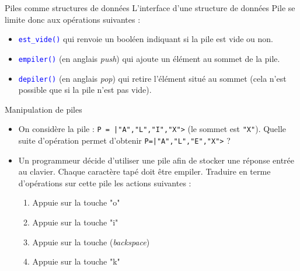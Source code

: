 \documentclass[10pt]{beamer}
\begin{document}
\begin{frame}{\Ctitle}{\stitle}
	\begin{alertblock}{Piles comme structures de données}
		L'interface d'une structure de données Pile se limite donc aux opérations suivantes :
		\begin{itemize}
			\item<2-> \textcolor{blue}{\tt est\_vide()} qui renvoie un booléen indiquant si la pile est vide ou non.
			\item<3-> \textcolor{blue}{\tt empiler()} (en anglais \textit{push}) qui ajoute un élément au sommet de la pile.
			\item<4-> \textcolor{blue}{\tt depiler()} (en anglais \textit{pop}) qui retire l'élément situé au sommet (cela n'est possible que si la pile n'est pas vide).
		\end{itemize}
	\end{alertblock}
\end{frame}

\begin{frame}{\Ctitle}{\stitle}
	\begin{exampleblock}{Manipulation de piles}
		\begin{itemize}
			\item<2-> On considère la pile : {\tt P = |"A","L","I","X">} (le sommet est {\tt "X"}). Quelle suite d'opération permet d'obtenir {\tt P=|"A","L","E","X">} ?
			\item<3-> Un programmeur décide d'utiliser une pile afin de stocker une réponse entrée au clavier. Chaque caractère tapé doit être empiler. Traduire en terme d'opérations sur cette pile les actions suivantes :
				\begin{enumerate}
					\item<4-> Appuie sur la touche "o"
					\item<5-> Appuie sur la touche "i"
					\item<6-> Appuie sur la touche \framebox{$\longleftarrow$} (\textit{backspace})
					\item<7-> Appuie sur la touche "k"
				\end{enumerate}
		\end{itemize}
	\end{exampleblock}
\end{frame}
\end{document}

